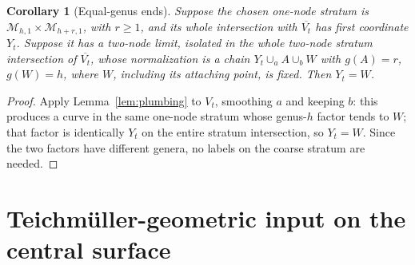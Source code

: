 \documentclass[12pt]{article}
\newcommand{\M}{\mathcal M}
\newcommand{\cl}[1]{\overline{#1}}
\newtheorem{corollary}[theorem]{Corollary}
\theoremstyle{remark}
\begin{document}
\begin{corollary}[Equal-genus ends]\label{cor:symmetric}
Suppose the chosen one-node stratum is
\(\M_{h,1}\times\M_{h+r,1}\), with \(r\geq1\), and its whole
intersection with \(\cl{V_t}\) has first coordinate \(Y_t\).
Suppose it has a two-node limit, isolated in the
\emph{whole} two-node stratum intersection of \(\cl{V_t}\),
whose normalization is a chain
\(Y_t\cup_a A\cup_b W\) with \(g(A)=r\), \(g(W)=h\),
where \(W\), including its attaching point, is fixed.
Then \(Y_t=W\).
\end{corollary}

\begin{proof}
Apply Lemma~\ref{lem:plumbing} to \(V_t\), smoothing \(a\) and keeping
\(b\): this produces a curve in the same one-node stratum whose
genus-\(h\) factor tends to \(W\); that factor is identically \(Y_t\)
on the entire stratum intersection, so \(Y_t=W\). Since the two
factors have different genera, no labels on the coarse stratum are
needed.
\end{proof}

\section{Teichm\"uller-geometric input on the central surface}\label{sec:teich}
\end{document}
